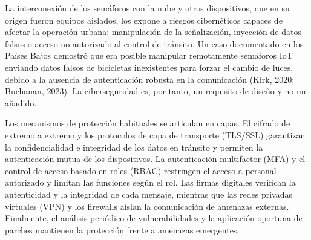 La interconexión de los semáforos con la nube y otros dispositivos, que en su origen fueron equipos aislados,
los expone a riesgos cibernéticos capaces de afectar la operación urbana: manipulación de la señalización,
inyección de datos falsos o acceso no autorizado al control de tránsito. Un caso documentado en los Países
Bajos demostró que era posible manipular remotamente semáforos IoT enviando datos falsos de bicicletas
inexistentes para forzar el cambio de luces, debido a la ausencia de autenticación robusta en la comunicación
(Kirk, 2020; Buchanan, 2023). La ciberseguridad es, por tanto, un requisito de diseño y no un añadido.

Los mecanismos de protección habituales se articulan en capas. El cifrado de extremo a extremo y los
protocolos de capa de transporte (TLS/SSL) garantizan la confidencialidad e integridad de los datos en
tránsito y permiten la autenticación mutua de los dispositivos. La autenticación multifactor (MFA) y el
control de acceso basado en roles (RBAC) restringen el acceso a personal autorizado y limitan las funciones
según el rol. Las firmas digitales verifican la autenticidad y la integridad de cada mensaje, mientras que
las redes privadas virtuales (VPN) y los firewalls aíslan la comunicación de amenazas externas. Finalmente,
el análisis periódico de vulnerabilidades y la aplicación oportuna de parches mantienen la protección frente
a amenazas emergentes.

